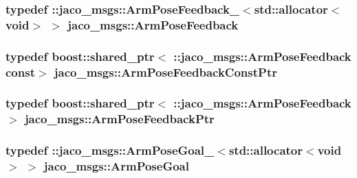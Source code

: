 \subsubsection[{\texorpdfstring{Arm\+Pose\+Feedback}{ArmPoseFeedback}}]{\setlength{\rightskip}{0pt plus 5cm}typedef \+::{\bf jaco\+\_\+msgs\+::\+Arm\+Pose\+Feedback\+\_\+}$<$std\+::allocator$<$void$>$ $>$ {\bf jaco\+\_\+msgs\+::\+Arm\+Pose\+Feedback}}\hypertarget{namespacejaco__msgs_a0157e0f10c971ac0b7a8f5c9ce836574}{}\label{namespacejaco__msgs_a0157e0f10c971ac0b7a8f5c9ce836574}
\subsubsection[{\texorpdfstring{Arm\+Pose\+Feedback\+Const\+Ptr}{ArmPoseFeedbackConstPtr}}]{\setlength{\rightskip}{0pt plus 5cm}typedef boost\+::shared\+\_\+ptr$<$ \+::{\bf jaco\+\_\+msgs\+::\+Arm\+Pose\+Feedback} const$>$ {\bf jaco\+\_\+msgs\+::\+Arm\+Pose\+Feedback\+Const\+Ptr}}\hypertarget{namespacejaco__msgs_a19e2f18483333fe0501cb35b4911cdde}{}\label{namespacejaco__msgs_a19e2f18483333fe0501cb35b4911cdde}
\subsubsection[{\texorpdfstring{Arm\+Pose\+Feedback\+Ptr}{ArmPoseFeedbackPtr}}]{\setlength{\rightskip}{0pt plus 5cm}typedef boost\+::shared\+\_\+ptr$<$ \+::{\bf jaco\+\_\+msgs\+::\+Arm\+Pose\+Feedback} $>$ {\bf jaco\+\_\+msgs\+::\+Arm\+Pose\+Feedback\+Ptr}}\hypertarget{namespacejaco__msgs_a931f0a0167ab47b32cb38d4f9a9d1233}{}\label{namespacejaco__msgs_a931f0a0167ab47b32cb38d4f9a9d1233}
\subsubsection[{\texorpdfstring{Arm\+Pose\+Goal}{ArmPoseGoal}}]{\setlength{\rightskip}{0pt plus 5cm}typedef \+::{\bf jaco\+\_\+msgs\+::\+Arm\+Pose\+Goal\+\_\+}$<$std\+::allocator$<$void$>$ $>$ {\bf jaco\+\_\+msgs\+::\+Arm\+Pose\+Goal}}\hypertarget{namespacejaco__msgs_a5ff16ec456eb5f8fa3902e12a781919f}{}\label{namespacejaco__msgs_a5ff16ec456eb5f8fa3902e12a781919f}
